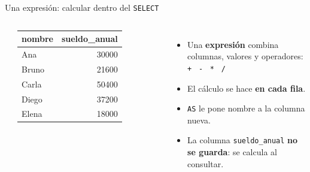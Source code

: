 \documentclass[aspectratio=169,10pt,c]{beamer}
\newcommand{\kw}[1]{\textcolor{utpRojo}{\textbf{#1}}}
\newcommand{\nuevo}[1]{{%
  \setlength{\fboxsep}{1.2pt}%
  \begingroup
  \renewcommand{\kw}[1]{\textcolor{utpNegro}{\textbf{##1}}}%
  \colorbox{yellow!45}{\textcolor{utpNegro}{#1}}%
  \endgroup}}
\newcommand{\ind}{\hspace*{1.6em}}
\newcommand{\piezax}{7.6}
\newcommand{\pieza}[3]{%
  \node[pieza] at (0,#1) {#2};
  \node[para] at (\piezax,#1) {\textcolor{utpRojo}{$\blacktriangleleft$}\ #3};}
\newcommand{\cab}[1]{\normalfont\bfseries #1}
\newcommand{\res}[3]{%
  \centering{\scriptsize\color{utpGris}resultado}\\[3pt]
  \footnotesize\ttfamily
  \begin{tabular}{#1}
  \toprule
  #2 \\
  \midrule
  #3
  \bottomrule
  \end{tabular}}
\begin{document}
\begin{frame}{Una expresión: calcular dentro del \texttt{SELECT}}
\begin{center}
\end{center}
\vspace{0.1cm}
\begin{columns}[c,onlytextwidth]
\res{lr}{\cab{nombre} & \cab{sueldo\_anual}}{%
  Ana & 30000 \\
  Bruno & 21600 \\
  Carla & 50400 \\
  Diego & 37200 \\
  Elena & 18000 \\}
\small
\begin{itemize}\setlength\itemsep{6pt}
  \item Una \textbf{expresión} combina columnas, valores y operadores: \texttt{+} \ \texttt{-} \ \texttt{*} \ \texttt{/}
  \item El cálculo se hace \textbf{en cada fila}.
  \item \texttt{AS} le pone nombre a la columna nueva.
  \item La columna \texttt{sueldo\_anual} \textbf{no se guarda}: se calcula al consultar.
\end{itemize}
\end{columns}
\end{frame}
\end{document}
